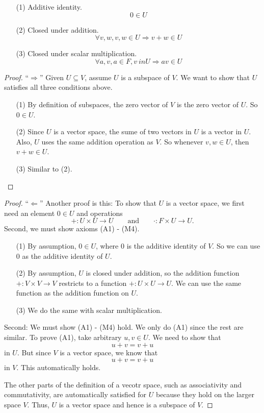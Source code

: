 \documentclass[11pt]{article}
\begin{document}
    \begin{enumerate}
        \item[(1)] Additive identity. \[0 \in U\]
        \item[(2)] Closed under addition. \[\forall v,w, v,w \in U \Rightarrow v + w \in U\] 
        \item[(3)] Closed under scalar multiplication. \[\forall a,v, a \in F, v \ in U \Rightarrow av \in U\] 
    \end{enumerate}
    \begin{proof}
        ``\(\Rightarrow\)'' Given \(U \subseteq V\), assume $U$ is a subspace of $V$. We want to show that $U$ satisfies all three conditions above.
        \begin{enumerate}
            \item[(1)] By definition of subspaces, the zero vector of $V$ is the zero vector of $U$. So \(0 \in U\).
            \item[(2)] Since $U$ is a vector space, the sume of two vectors in $U$ is a vector in $U$. Also, $U$ uses the same addition operation as $V$. So whenever \(v,w \in U\), then \(v + w \in U.\)
            \item[(3)] Similar to (2).  
        \end{enumerate}
    \end{proof}

    \begin{proof}
        ``\(\Leftarrow\)'' Another proof is this: To show that $U$ is a vector space, we first need an element \(0 \in U\) and operations \[+ : U \times U \rightarrow U \qquad \text{and} \qquad \cdot : F \times U \rightarrow U.\] Second, we must show axioms (A1) - (M4).
        \begin{enumerate}
            \item[(1)] By assumption, \(0 \in U\), where 0 is the additive identity of $V$. So we can use 0 as the additive identity of $U$.
            \item[(2)] By assumption, $U$ is closed under addition, so the addition function \(+ : V \times V \rightarrow V\) restricts to a function \(+ : U \times U \rightarrow U.\) We can use the same function as the addition function on $U$. 
            \item[(3)] We do the same with scalar multiplication. 
        \end{enumerate}
        Second: We must show (A1) - (M4) hold. We only do (A1) since the rest are similar. To prove (A1), take arbitrary \(u,v \in U\). We need to show that \[u + v = v + u\] in $U$. But since $V$ is a vector space, we know that \[u + v = v + u\] in $V$. This automatically holds.

        \vspace{1em}

        The other parts of the definition of a vecotr space, such as associativity and commutativity, are automatically satisfied for $U$ because they hold on the larger space $V$. Thus, $U$ is a vector space and hence is a subspace of $V$.
    \end{proof}
\end{document}
